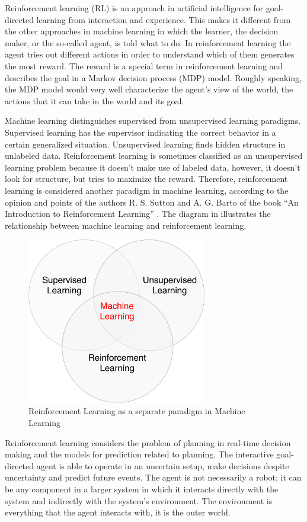 Reinforcement learning (RL) is an approach in artificial intelligence for goal-directed learning from interaction and experience. This makes it different from the other approaches in machine learning in which the learner, the decision maker, or the so-called agent, is told what to do. In reinforcement learning the agent tries out different actions in order to understand which of them generates the most reward. The reward is a special term in reinforcement learning and describes the goal in a Markov decision process (MDP) model. Roughly speaking, the MDP model would very well characterize the agent’s view of the world, the actions that it can take in the world and its goal.

Machine learning distinguishes supervised from unsupervised learning paradigms. Supervised learning has the supervisor indicating the correct behavior in a certain generalized situation. Unsupervised learning finds hidden structure in unlabeled data. Reinforcement learning is sometimes classified as an unsupervised learning problem because it doesn’t make use of labeled data, however, it doesn’t look for structure, but tries to maximize the reward. Therefore, reinforcement learning is considered another paradigm in machine learning, according to the opinion and points of the authors R. S. Sutton and A. G. Barto of the book “An Introduction to Reinforcement Learning” \cite{Sutton}. The diagram in  illustrates the relationship between machine learning and reinforcement learning.
\begin{figure}[H]
	\centering
	\includegraphics[width=0.7\textwidth]{Figures/RLandML}
	\caption{Reinforcement Learning as a separate paradigm in Machine Learning}
	\label{fig:RLandML}
\end{figure}
Reinforcement learning considers the problem of planning in real-time decision making and the models for prediction related to planning. The interactive goal-directed agent is able to operate in an uncertain setup, make decisions despite uncertainty and predict future events. The agent is not necessarily a robot; it can be any component in a larger system in which it interacts directly with the system and indirectly with the system’s environment. The environment is everything that the agent interacts with, it is the outer world.

